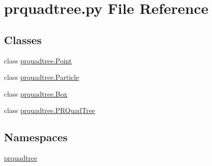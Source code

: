 \section{prquadtree.\+py File Reference}
\label{prquadtree_8py}
\subsection*{Classes}
\begin{DoxyCompactItemize}
\item 
class \hyperlink{classprquadtree_1_1Point}{prquadtree.\+Point}
\item 
class \hyperlink{classprquadtree_1_1Particle}{prquadtree.\+Particle}
\item 
class \hyperlink{classprquadtree_1_1Box}{prquadtree.\+Box}
\item 
class \hyperlink{classprquadtree_1_1PRQuadTree}{prquadtree.\+P\+R\+Quad\+Tree}
\end{DoxyCompactItemize}
\subsection*{Namespaces}
\begin{DoxyCompactItemize}
\item 
 \hyperlink{namespaceprquadtree}{prquadtree}
\end{DoxyCompactItemize}
